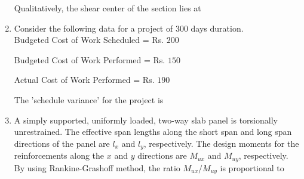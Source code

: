 \documentclass[journal,12pt,onecolumn]{article}
\theoremstyle{remark}
\begin{document}
\begin{enumerate}
    Qualitatively, the shear center of the section lies at
    
    \hfill{}
    \begin{enumerate}
    \end{enumerate}
    
    \item Consider the following data for a project of $300$ days duration.\\
    Budgeted Cost of Work Scheduled  = Rs. $200$
    
    Budgeted Cost of Work Performed  = Rs. $150$
    
    Actual Cost of Work Performed  = Rs. $190$
    
    The 'schedule variance' for the project is
    
    \hfill{}
    \begin{enumerate}
    \end{enumerate}

    \item A simply supported, uniformly loaded, two-way slab panel is torsionally
    unrestrained. The effective span lengths along the short span  and long span 
    directions of the panel are $l_x$ and $l_y$, respectively. The design moments for the
    reinforcements along the $x$ and $y$ directions are $M_{ux}$ and $M_{uy}$, respectively. By using
    Rankine-Grashoff method, the ratio $M_{ux}/M_{uy}$ is proportional to
    
    \hfill{}
    \begin{enumerate}
    \end{enumerate}
    

\end{enumerate}
\end{document}
